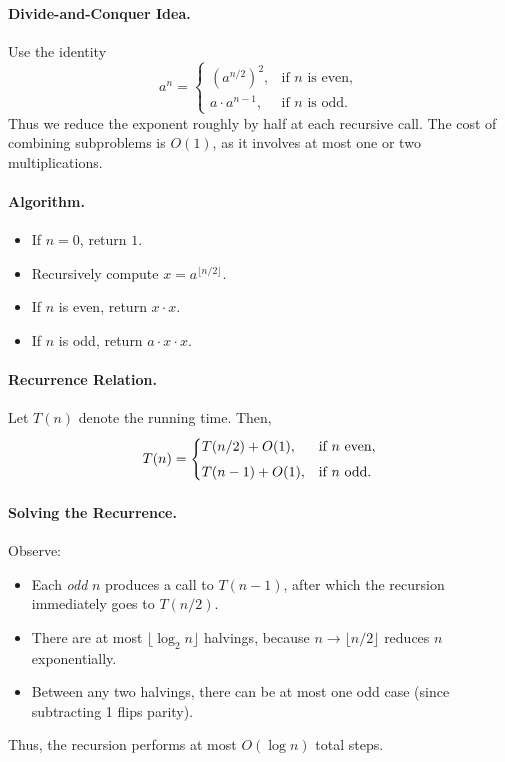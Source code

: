 \documentclass[9pt]{extarticle}
\begin{document}
\paragraph{Divide-and-Conquer Idea.}
Use the identity
\[
  a^n =
  \begin{cases}
    \left(a^{n/2}\right)^2, & \text{if $n$ is even},\\[4pt]
    a \cdot a^{n-1}, & \text{if $n$ is odd}.
  \end{cases}
\]
Thus we reduce the exponent roughly by half at each recursive call.
The cost of combining subproblems is $O(1)$, as it involves at most one or two multiplications.

\paragraph{Algorithm.}
\begin{itemize}
  \item If $n = 0$, return $1$.
  \item Recursively compute $x = a^{\lfloor n/2 \rfloor}$.
  \item If $n$ is even, return $x \cdot x$.
  \item If $n$ is odd, return $a \cdot x \cdot x$.
\end{itemize}

\paragraph{Recurrence Relation.}
Let $T(n)$ denote the running time.
Then,
\[
  T(n) =
  \begin{cases}
    T(n/2) + O(1), & \text{if $n$ \text{even}},\\[4pt]
    T(n-1) + O(1), & \text{if $n$ \text{odd}}.
  \end{cases}
\]

\paragraph{Solving the Recurrence.}
Observe:
\begin{itemize}
  \item Each \emph{odd} $n$ produces a call to $T(n-1)$, after which the recursion immediately goes to $T(n/2)$.
  \item There are at most $\lfloor \log_2 n \rfloor$ halvings, because $n \to \lfloor n/2 \rfloor$ reduces $n$ exponentially.
  \item Between any two halvings, there can be at most one odd case (since subtracting 1 flips parity).
\end{itemize}
Thus, the recursion performs at most $O(\log n)$ total steps.
\end{document}
